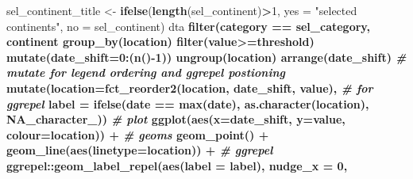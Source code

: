 \documentclass[]{article}
\newenvironment{Shaded}{\begin{snugshade}}{\end{snugshade}}
\newcommand{\CommentTok}[1]{\textcolor[rgb]{0.56,0.35,0.01}{\textit{#1}}}
\newcommand{\DataTypeTok}[1]{\textcolor[rgb]{0.13,0.29,0.53}{#1}}
\newcommand{\DecValTok}[1]{\textcolor[rgb]{0.00,0.00,0.81}{#1}}
\newcommand{\KeywordTok}[1]{\textcolor[rgb]{0.13,0.29,0.53}{\textbf{#1}}}
\newcommand{\NormalTok}[1]{#1}
\newcommand{\OperatorTok}[1]{\textcolor[rgb]{0.81,0.36,0.00}{\textbf{#1}}}
\newcommand{\OtherTok}[1]{\textcolor[rgb]{0.56,0.35,0.01}{#1}}
\newcommand{\StringTok}[1]{\textcolor[rgb]{0.31,0.60,0.02}{#1}}
\begin{document}
\begin{Shaded}
\begin{Highlighting}[]
{\NormalTok{  sel_continent_title <-}\StringTok{ }\KeywordTok{ifelse}\NormalTok{(}\KeywordTok{length}\NormalTok{(sel_continent)}\OperatorTok{>}\DecValTok{1}\NormalTok{,}
                                \DataTypeTok{yes =} \StringTok{"selected continents"}\NormalTok{,}
                                \DataTypeTok{no =}\NormalTok{ sel_continent)}
\NormalTok{  dta }\OperatorTok{%>%}\StringTok{ }
\StringTok{    }\KeywordTok{filter}\NormalTok{(category }\OperatorTok{==}\StringTok{ }\NormalTok{sel_category, }
\NormalTok{           continent }\OperatorTok{%in%}\StringTok{ }\NormalTok{sel_continent) }\OperatorTok{%>%}\StringTok{ }
\StringTok{    }\KeywordTok{group_by}\NormalTok{(location) }\OperatorTok{%>%}\StringTok{ }
\StringTok{    }\KeywordTok{filter}\NormalTok{(value}\OperatorTok{>=}\NormalTok{threshold) }\OperatorTok{%>%}\StringTok{ }
\StringTok{    }\KeywordTok{mutate}\NormalTok{(}\DataTypeTok{date_shift=}\DecValTok{0}\OperatorTok{:}\NormalTok{(}\KeywordTok{n}\NormalTok{()}\OperatorTok{-}\DecValTok{1}\NormalTok{)) }\OperatorTok{%>%}\StringTok{ }\CommentTok{# generate date shifted after threshold}
\StringTok{    }\KeywordTok{ungroup}\NormalTok{(location) }\OperatorTok{%>%}\StringTok{ }
\StringTok{    }\KeywordTok{arrange}\NormalTok{(date_shift) }\OperatorTok{%>%}\StringTok{ }
\StringTok{    }\CommentTok{# mutate for legend ordering and ggrepel postioning}
\StringTok{    }\KeywordTok{mutate}\NormalTok{(}\DataTypeTok{location=}\KeywordTok{fct_reorder2}\NormalTok{(location, date_shift, value), }
           \CommentTok{# for ggrepel}
           \DataTypeTok{label =} \KeywordTok{ifelse}\NormalTok{(date }\OperatorTok{==}\StringTok{ }\KeywordTok{max}\NormalTok{(date),}
                          \KeywordTok{as.character}\NormalTok{(location), }
                          \OtherTok{NA_character_}\NormalTok{)) }\OperatorTok{%>%}
\StringTok{    }\CommentTok{# plot  }
\StringTok{    }\KeywordTok{ggplot}\NormalTok{(}\KeywordTok{aes}\NormalTok{(}\DataTypeTok{x=}\NormalTok{date_shift, }\DataTypeTok{y=}\NormalTok{value, }\DataTypeTok{colour=}\NormalTok{location)) }\OperatorTok{+}\StringTok{ }
\StringTok{    }\CommentTok{# geoms}
\StringTok{    }\KeywordTok{geom_point}\NormalTok{() }\OperatorTok{+}
\StringTok{    }\KeywordTok{geom_line}\NormalTok{(}\KeywordTok{aes}\NormalTok{(}\DataTypeTok{linetype=}\NormalTok{location)) }\OperatorTok{+}\StringTok{ }
\StringTok{    }
\StringTok{    }\CommentTok{# ggrepel }
\StringTok{    }\NormalTok{ggrepel}\OperatorTok{::}\KeywordTok{geom_label_repel}\NormalTok{(}\KeywordTok{aes}\NormalTok{(}\DataTypeTok{label =}\NormalTok{ label),}
                              \DataTypeTok{nudge_x =} \DecValTok{0}\NormalTok{,}
}}}}}}}}}
\end{Highlighting}
\end{Shaded}
\end{document}
